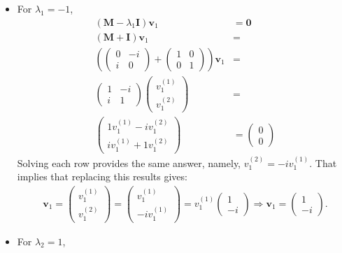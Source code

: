 \documentclass[letterpaper,11pt,twoside]{article}
\begin{document}
\begin{itemize}
  \item For $\lambda_1=-1$,
  \begin{align*}
    (\bm{M}-\lambda_1\bm{I})\bm{v}_1&=\bm{0}\\
    (\bm{M}+\bm{I})\bm{v}_1&=\\
    \left(\begin{pmatrix}
      0&-i\\i&0
    \end{pmatrix}+\begin{pmatrix}
      1&0\\0&1
    \end{pmatrix}\right)\bm{v}_1&=\\
    \begin{pmatrix}
      1&-i\\i&1
    \end{pmatrix}\begin{pmatrix}
    v_1^{(1)}\\v_1^{(2)}
    \end{pmatrix}&=\\
    \begin{pmatrix}
      1v_1^{(1)}-iv_1^{(2)}\\
      iv_1^{(1)}+1v_1^{(2)}
    \end{pmatrix}&=\begin{pmatrix}
      0\\0
    \end{pmatrix}
  \end{align*}
  Solving each row provides the same answer, namely, $v_1^{(2)}=-iv_1^{(1)}$. That implies that replacing this results gives:
  \begin{align*}
    \bm{v}_1=\begin{pmatrix}
    v_1^{(1)}\\v_1^{(2)}
    \end{pmatrix}=\begin{pmatrix}
      v_1^{(1)}\\-iv_1^{(1)}
    \end{pmatrix}=v_1^{(1)}\begin{pmatrix}
      1\\-i
    \end{pmatrix}\Longrightarrow\bm{v}_1=\begin{pmatrix}
      1\\-i
    \end{pmatrix}.
  \end{align*}
  \item For $\lambda_2=1$,

\end{itemize}
\end{document}
